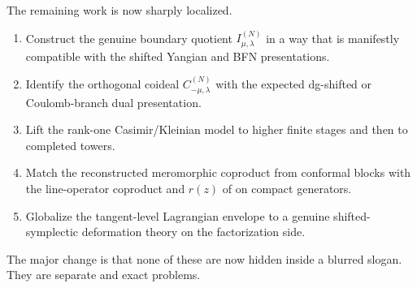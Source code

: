 \begin{remark}
\label{rem:what-remains-open}
The remaining work is now sharply localized.
\begin{enumerate}[label=\textup{(\roman*)}]
\item Construct the genuine boundary quotient $I_{\mu,\lambda}^{(N)}$ in a way that
  is manifestly compatible with the shifted Yangian and BFN presentations.
\item Identify the orthogonal coideal $C_{-\mu,\lambda}^{(N)}$ with the expected
  dg-shifted or Coulomb-branch dual presentation.
\item Lift the rank-one Casimir/Kleinian model to higher finite stages and then
  to completed towers.
\item Match the reconstructed meromorphic coproduct from conformal blocks with
  the line-operator coproduct and $r(z)$ of \cite{DNP25} on compact generators.
\item Globalize the tangent-level Lagrangian envelope to a genuine shifted-
  symplectic deformation theory on the factorization side.
\end{enumerate}
The major change is that none of these are now hidden inside a blurred slogan.
They are separate and exact problems.
\end{remark}
